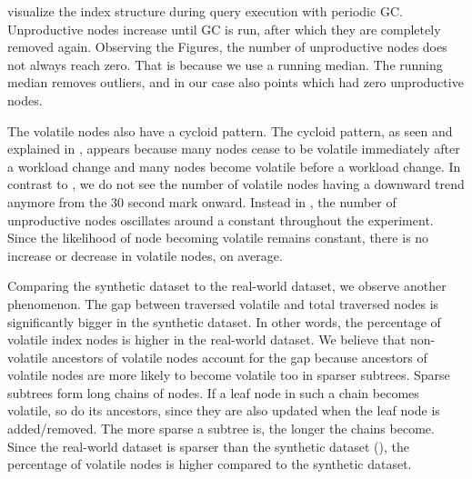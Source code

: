 \documentclass[abstracton,12pt]{scrartcl}
\theoremstyle{definition}
\begin{document}
 visualize the index
structure during query execution with periodic GC. Unproductive
nodes increase until GC is run, after which they are completely removed again.
Observing the Figures, the number of unproductive nodes does not always reach zero.
That is because we use a running median. The running median removes outliers, and in
our case also points which had zero unproductive nodes.

The volatile nodes also have a cycloid pattern.
The cycloid pattern, as seen and explained in
,
appears because many nodes cease to be volatile immediately after
a workload change and many nodes become volatile before a workload change.
In contrast to , 
we do not see the number of volatile nodes
having a downward trend anymore from the 30 second mark onward.
Instead in , 
the number of unproductive nodes oscillates around a constant throughout the experiment. 
Since the likelihood of node becoming volatile remains constant, there is no
increase or decrease in volatile nodes, on average.

Comparing the synthetic dataset to the real-world dataset, we observe another phenomenon.
The gap between traversed volatile and total traversed nodes is significantly bigger
in the synthetic dataset. In other words, the percentage of volatile index nodes
is higher in the real-world dataset. We believe that non-volatile
ancestors of volatile nodes account for the gap
because ancestors of volatile nodes are more likely to become volatile too in
sparser subtrees. Sparse subtrees form long chains of nodes. If a leaf node
in such a chain becomes volatile, so do its ancestors, since they are also
updated when the leaf node is added/removed. The more sparse a subtree is, the longer
the chains become.
Since the real-world dataset is sparser than the synthetic dataset (),
the percentage of volatile nodes is higher compared to the synthetic dataset.
\end{document}

